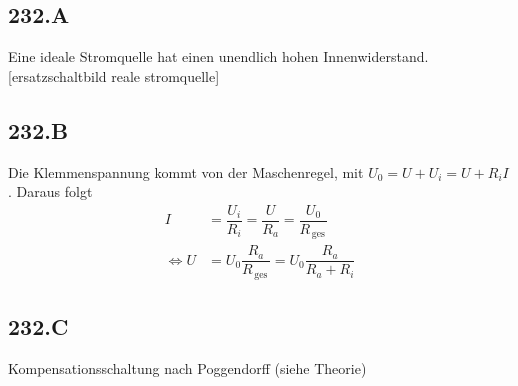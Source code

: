 \documentclass[a4paper,12pt]{article}
\numberwithin{equation}{section}
\begin{document}
\subsection{232.A}
Eine ideale Stromquelle hat einen unendlich hohen Innenwiderstand. [ersatzschaltbild reale stromquelle]

\subsection{232.B}
Die Klemmenspannung kommt von der Maschenregel, mit $U_0=U+U_i=U+R_iI$. Daraus folgt
\begin{align} 
        I&=\dfrac{U_i}{R_i}=\dfrac{U}{R_a}=\dfrac{U_0}{R_{\,\text{ges}\,}}\\
        \Leftrightarrow U&=U_0\dfrac{R_a}{R_{\,\text{ges}\,}}=U_0\dfrac{R_a}{R_a+R_i}
\end{align} 

\subsection{232.C}
Kompensationsschaltung nach Poggendorff (siehe Theorie)

\end{document}
